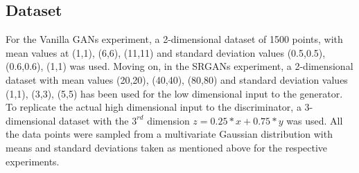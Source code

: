 \documentclass[10pt,journal,compsoc]{IEEEtran}
\begin{document}
\subsection{Dataset}\label{Sec31}
For the Vanilla GANs experiment, a 2-dimensional dataset of 1500 points, with mean values at (1,1), (6,6), (11,11) and standard deviation values (0.5,0.5), (0.6,0.6), (1,1) was used. Moving on, in the SRGANs experiment, a 2-dimensional dataset with mean values (20,20), (40,40), (80,80) and standard deviation values (1,1), (3,3), (5,5) has been used for the low dimensional input to the generator. To replicate the actual high dimensional input to the discriminator, a 3-dimensional dataset with the $3^{rd}$ dimension \(z = 0.25*x + 0.75*y\) was used. All the data points were sampled from a multivariate Gaussian distribution with means and standard deviations taken as mentioned above for the respective experiments.
\end{document}
